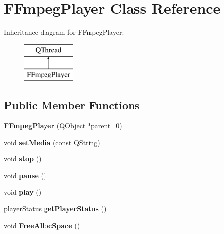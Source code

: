 \hypertarget{class_f_fmpeg_player}{}\section{F\+Fmpeg\+Player Class Reference}
\label{class_f_fmpeg_player}
Inheritance diagram for F\+Fmpeg\+Player\+:\begin{figure}[H]
\begin{center}
\leavevmode
\includegraphics[height=2.000000cm]{class_f_fmpeg_player}
\end{center}
\end{figure}
\subsection*{Public Member Functions}
\begin{DoxyCompactItemize}
\item 
\mbox{\label{class_f_fmpeg_player_afaa74be369efb037b7bf3fa8e0adaa58}} 
{\bfseries F\+Fmpeg\+Player} (Q\+Object $\ast$parent=0)
\item 
\mbox{\label{class_f_fmpeg_player_a8ec741a3a598ff8e150582a235596026}} 
void {\bfseries set\+Media} (const Q\+String)
\item 
\mbox{\label{class_f_fmpeg_player_abf013084d806301ca5d8a6bdeaf190ce}} 
void {\bfseries stop} ()
\item 
\mbox{\label{class_f_fmpeg_player_a5666d7165689368681832e2c00d8c02b}} 
void {\bfseries pause} ()
\item 
\mbox{\label{class_f_fmpeg_player_ac09421af5420f08b7d5505a01b20170b}} 
void {\bfseries play} ()
\item 
\mbox{\label{class_f_fmpeg_player_a0f9a5d6a29a7b38cc2299de5a2d1c660}} 
player\+Status {\bfseries get\+Player\+Status} ()
\item 
\mbox{\label{class_f_fmpeg_player_a943011c11e32d9b05f5bc83c3225407b}} 
void {\bfseries Free\+Alloc\+Space} ()
\end{DoxyCompactItemize}
